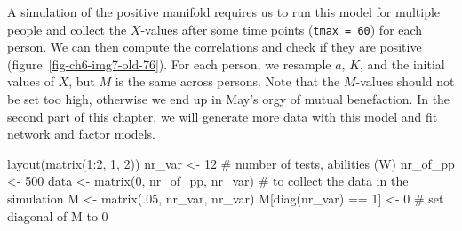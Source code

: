 \documentclass[
  a4paper,
  DIV=11,
  numbers=noendperiod,
  oneside]{scrreprt}
\newenvironment{Shaded}{}{}
\newcommand{\CommentTok}[1]{\textcolor[rgb]{0.42,0.45,0.49}{#1}}
\newcommand{\DecValTok}[1]{\textcolor[rgb]{0.00,0.36,0.77}{#1}}
\newcommand{\FunctionTok}[1]{\textcolor[rgb]{0.44,0.26,0.76}{#1}}
\newcommand{\NormalTok}[1]{\textcolor[rgb]{0.14,0.16,0.18}{#1}}
\newcommand{\OtherTok}[1]{\textcolor[rgb]{0.44,0.26,0.76}{#1}}
\newcommand{\SpecialCharTok}[1]{\textcolor[rgb]{0.00,0.36,0.77}{#1}}
\begin{document}
A simulation of the positive manifold requires us to run this model for
multiple people and collect the \(X\)-values after some time points
(\texttt{tmax\ =\ 60}) for each person. We can then compute the
correlations and check if they are positive
(figure~\ref{fig-ch6-img7-old-76}). For each person, we resample \(a\),
\(K\), and the initial values of \(X\), but \(M\) is the same across
persons. Note that the \(M\)-values should not be set too high,
otherwise we end up in May's orgy of mutual benefaction. In the second
part of this chapter, we will generate more data with this model and fit
network and factor models.

\begin{Shaded}
\begin{Highlighting}[]
\FunctionTok{layout}\NormalTok{(}\FunctionTok{matrix}\NormalTok{(}\DecValTok{1}\SpecialCharTok{:}\DecValTok{2}\NormalTok{, }\DecValTok{1}\NormalTok{, }\DecValTok{2}\NormalTok{))}
\NormalTok{nr\_var }\OtherTok{\textless{}{-}} \DecValTok{12} \CommentTok{\# number of tests, abilities (W)}
\NormalTok{nr\_of\_pp }\OtherTok{\textless{}{-}} \DecValTok{500}
\NormalTok{data }\OtherTok{\textless{}{-}} \FunctionTok{matrix}\NormalTok{(}\DecValTok{0}\NormalTok{, nr\_of\_pp, nr\_var) }\CommentTok{\# to collect the data in the simulation}
\NormalTok{M }\OtherTok{\textless{}{-}} \FunctionTok{matrix}\NormalTok{(.}\DecValTok{05}\NormalTok{, nr\_var, nr\_var)}
\NormalTok{M[}\FunctionTok{diag}\NormalTok{(nr\_var) }\SpecialCharTok{==} \DecValTok{1}\NormalTok{] }\OtherTok{\textless{}{-}} \DecValTok{0} \CommentTok{\# set diagonal of M to 0}


\end{Highlighting}
\end{Shaded}
\end{document}
